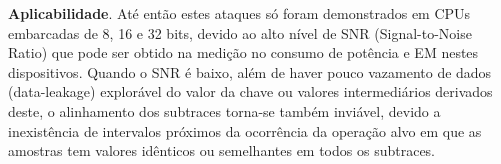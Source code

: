 \noindent \textbf{Aplicabilidade}. Até então estes ataques só foram demonstrados em CPUs embarcadas de 8, 16 e 32 bits, devido ao alto nível de SNR (Signal-to-Noise Ratio) que pode ser obtido na medição no consumo de potência e EM nestes dispositivos. Quando o SNR é baixo, além de haver pouco vazamento de dados (data-leakage) explorável do valor da chave ou valores intermediários derivados deste, o alinhamento dos subtraces torna-se também inviável, devido a inexistência de intervalos próximos da ocorrência da operação alvo em que as amostras tem valores idênticos ou semelhantes em todos os subtraces.

